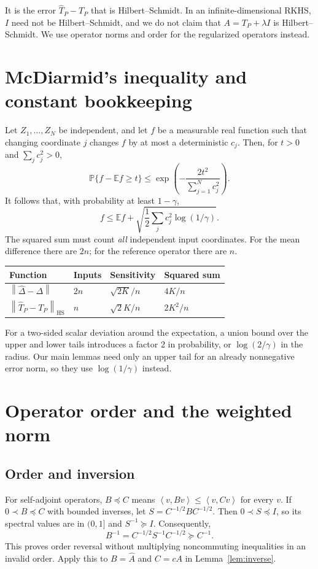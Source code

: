 \documentclass[11pt,a4paper]{article}
\theoremstyle{definition}
\theoremstyle{remark}
\newcommand{\E}{\mathbb E}
\newcommand{\Prob}{\mathbb P}
\newcommand{\norm}[1]{\left\lVert#1\right\rVert}
\newcommand{\inner}[2]{\left\langle#1,#2\right\rangle}
\newcommand{\HS}{\mathrm{HS}}
\begin{document}
It is the error $\widehat T_P-T_P$ that is Hilbert--Schmidt. In an
infinite-dimensional RKHS, $I$ need not be Hilbert--Schmidt, and we
do not claim that $A=T_P+\lambda I$ is Hilbert--Schmidt. We use
operator norms and order for the regularized operators instead.

\section{McDiarmid's inequality and constant bookkeeping}\label{app:mcdiarmid}

Let $Z_1,\ldots,Z_N$ be independent, and let $f$ be a measurable
real function such that changing coordinate $j$ changes $f$ by at
most a deterministic $c_j$. Then, for $t>0$ and $\sum_j c_j^2>0$,
\begin{equation}\label{eq:mcdiarmid}
 \Prob\{f-\E f\ge t\}
 \le\exp\left(-\frac{2t^2}{\sum_{j=1}^Nc_j^2}\right).
\end{equation}
It follows that, with probability at least $1-\gamma$,
\[
 f\le\E f+\sqrt{\frac12\sum_jc_j^2\log(1/\gamma)}.
\]
The squared sum must count \emph{all} independent input coordinates.
For the mean difference there are $2n$; for the reference operator
there are $n$.
\begin{center}
\begin{tabular}{llll}
\toprule
Function & Inputs & Sensitivity & Squared sum\\
\midrule
$\norm{\widehat\Delta-\Delta}$ & $2n$ & $\sqrt{2K}/n$ & $4K/n$\\
$\norm{\widehat T_P-T_P}_{\HS}$ & $n$ & $\sqrt2K/n$ & $2K^2/n$\\
\bottomrule
\end{tabular}
\end{center}
For a two-sided scalar deviation around the expectation, a union bound
over the upper and lower tails introduces a factor $2$ in probability,
or $\log(2/\gamma)$ in the radius. Our main lemmas need only an
upper tail for an already nonnegative error norm, so they use
$\log(1/\gamma)$ instead.

\section{Operator order and the weighted norm}
\label{app:order}

\subsection{Order and inversion}
For self-adjoint operators, $B\preceq C$ means
$\inner{v}{Bv}\le\inner{v}{Cv}$ for every $v$.
If $0\prec B\preceq C$ with bounded inverses, let
$S=C^{-1/2}BC^{-1/2}$. Then $0\prec S\preceq I$, so its spectral
values are in $(0,1]$ and $S^{-1}\succeq I$. Consequently,
\[
 B^{-1}=C^{-1/2}S^{-1}C^{-1/2}\succeq C^{-1}.
\]
This proves order reversal without multiplying noncommuting inequalities
in an invalid order. Apply this to $B=\widehat A$ and $C=cA$ in Lemma~\ref{lem:inverse}.
\end{document}
